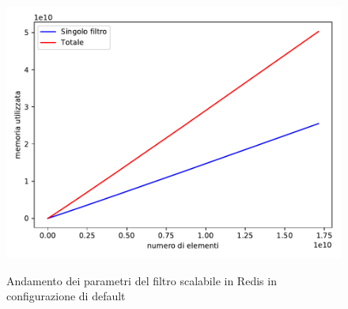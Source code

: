\begin{figure}
\begin{minipage}[c]{0.7\textwidth}
{      \includegraphics[width=\textwidth]{img/scalingbloom_memory}
    }
  \end{minipage}

  \caption{Andamento dei parametri del filtro scalabile in Redis in con\-fi\-gu\-ra\-zio\-ne di
  default}
  \label{fig:scalingbloom}
\end{figure}
















